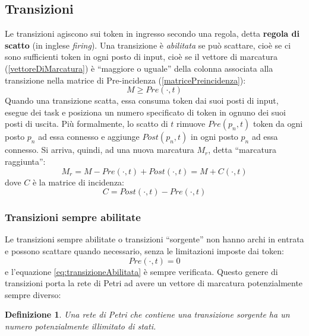 \documentclass[a4paper]{report}
\newtheorem{definizione}{Definizione}
\newcommand{\bo}{\bfseries }
\begin{document}
\subsection{Transizioni}
Le transizioni agiscono sui token in ingresso secondo una regola, detta
{\bo regola di scatto} (in inglese
{\em firing}). Una transizione \`e {\em 
  abilitata} se pu\`o scattare, cio\`e se ci sono sufficienti token in
ogni posto di input, cio\`e se il vettore di marcatura
(\ref{vettoreDiMarcatura}) \`e ``maggiore o uguale'' della colonna
associata alla transizione nella matrice di Pre-incidenza
(\ref{matricePreincidenza}): 
\begin{equation}\label{eq:transizioneAbilitata}
M \geq Pre(\cdot,t)
\end{equation}
Quando una transizione scatta, essa consuma token dai suoi
posti di input, esegue dei task e posiziona un numero specificato di
token in ognuno dei suoi posti di uscita. Pi\`u formalmente, lo scatto
di $t$ rimuove $Pre(p_n,t)$ token da ogni posto $p_n$ ad essa connesso
e aggiunge $Post(p_n,t)$ in ogni posto $p_n$ ad essa connesso. Si
arriva, quindi, ad una nuova marcatura $M_r$, detta ``marcatura
raggiunta'':
\begin{equation}\label{eq:marcaturaPostScatto}
  M_r = M - Pre(\cdot,t) + Post(\cdot,t) = M + C(\cdot,t)
\end{equation}
dove $C$ \`e la matrice di incidenza:
\[
C = Post(\cdot, t) - Pre(\cdot, t)
\]

\subsubsection{Transizioni sempre abilitate}
Le transizioni sempre abilitate o transizioni ``sorgente'' non
hanno archi in entrata e possono scattare quando necessario, senza
le limitazioni imposte dai token:
\[
Pre(\cdot,t) = 0
\]
e l'equazione \ref{eq:transizioneAbilitata} \`e sempre verificata.
Questo genere di transizioni porta la rete di Petri ad avere un
vettore di marcatura potenzialmente sempre diverso:
\begin{definizione}
  Una rete di Petri che contiene una transizione sorgente ha un numero
  potenzialmente illimitato di stati.
\end{definizione}
\end{document}
